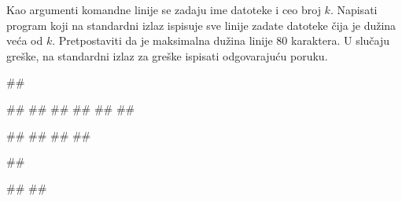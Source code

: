 


\begin{Exercise}[label=p3_03] 
 Kao argumenti komandne linije se zadaju ime datoteke i ceo broj $k$. 
 Napisati program koji na  standardni izlaz ispisuje sve linije zadate datoteke čija je dužina veća od $k$. 
 Pretpostaviti da je maksimalna dužina linije $80$ karaktera.
 U slučaju greške, na standardni izlaz za greške ispisati odgovarajuću poruku.

\begin{miditest}
\begin{upotreba}{1}
##

##
##
##
##
##
##

#\naslovIzlaz#
##
##
##
\end{upotreba}
\end{miditest}
\begin{miditest}
\begin{upotreba}{2}
##

#\naslovIzlazZaGresku#
##
\end{upotreba}
\end{miditest}
\end{Exercise}
\begin{Answer}[ref=p3_03]
\end{Answer}


